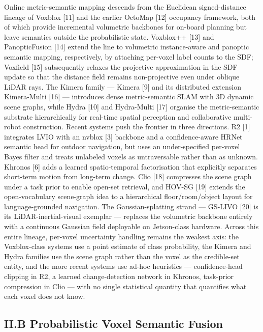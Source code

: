 \documentclass[
]{article}
\begin{document}
Online metric-semantic mapping descends from the Euclidean
signed-distance lineage of Voxblox {[}11{]} and the earlier OctoMap
{[}12{]} occupancy framework, both of which provide incremental
volumetric backbones for on-board planning but leave semantics outside
the probabilistic state. Voxblox++ {[}13{]} and PanopticFusion {[}14{]}
extend the line to volumetric instance-aware and panoptic semantic
mapping, respectively, by attaching per-voxel label counts to the SDF;
Voxfield {[}15{]} subsequently relaxes the projective approximation in
the SDF update so that the distance field remains non-projective even
under oblique LiDAR rays. The Kimera family --- Kimera {[}9{]} and its
distributed extension Kimera-Multi {[}16{]} --- introduces dense
metric-semantic SLAM with 3D dynamic scene graphs, while Hydra {[}10{]}
and Hydra-Multi {[}17{]} organise the metric-semantic substrate
hierarchically for real-time spatial perception and collaborative
multi-robot construction. Recent systems push the frontier in three
directions. R2 {[}1{]} integrates LVIO with an nvblox {[}3{]} backbone
and a confidence-aware HRNet semantic head for outdoor navigation, but
uses an under-specified per-voxel Bayes filter and treats unlabeled
voxels as untraversable rather than as unknown. Khronos {[}6{]} adds a
learned spatio-temporal factorisation that explicitly separates
short-term motion from long-term change. Clio {[}18{]} compresses the
scene graph under a task prior to enable open-set retrieval, and HOV-SG
{[}19{]} extends the open-vocabulary scene-graph idea to a hierarchical
floor/room/object layout for language-grounded navigation. The
Gaussian-splatting strand --- GS-LIVO {[}20{]} is its
LiDAR-inertial-visual exemplar --- replaces the volumetric backbone
entirely with a continuous Gaussian field deployable on Jetson-class
hardware. Across this entire lineage, per-voxel uncertainty handling
remains the weakest axis: the Voxblox-class systems use a point estimate
of class probability, the Kimera and Hydra families use the scene graph
rather than the voxel as the credible-set entity, and the more recent
systems use ad-hoc heuristics --- confidence-head clipping in R2, a
learned change-detection network in Khronos, task-prior compression in
Clio --- with no single statistical quantity that quantifies what each
voxel does not know.

\subsection{II.B Probabilistic Voxel Semantic
Fusion}\label{iib-probabilistic-voxel-semantic-fusion}
\end{document}
